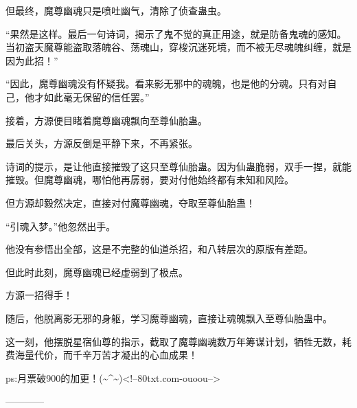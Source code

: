 \begin{this_body}
但最终，魔尊幽魂只是喷吐幽气，清除了侦查蛊虫。

“果然是这样。最后一句诗词，揭示了鬼不觉的真正用途，就是防备鬼魂的感知。当初盗天魔尊能盗取落魄谷、荡魂山，穿梭沉迷死境，而不被无尽魂魄纠缠，就是因为此招！”

“因此，魔尊幽魂没有怀疑我。看来影无邪中的魂魄，也是他的分魂。只有对自己，他才如此毫无保留的信任罢。”

接着，方源便目睹着魔尊幽魂飘向至尊仙胎蛊。

最后关头，方源反倒是平静下来，不再紧张。

诗词的提示，是让他直接摧毁了这只至尊仙胎蛊。因为仙蛊脆弱，双手一捏，就能摧毁。但魔尊幽魂，哪怕他再孱弱，要对付他始终都有未知和风险。

但方源却毅然决定，直接对付魔尊幽魂，夺取至尊仙胎蛊！

“引魂入梦。”他忽然出手。

他没有参悟出全部，这是不完整的仙道杀招，和八转层次的原版有差距。

但此时此刻，魔尊幽魂已经虚弱到了极点。

方源一招得手！

随后，他脱离影无邪的身躯，学习魔尊幽魂，直接让魂魄飘入至尊仙胎蛊中。

这一刻，他摆脱星宿仙尊的指示，截取了魔尊幽魂数万年筹谋计划，牺牲无数，耗费海量代价，而千辛万苦才凝出的心血成果！

ps:月票破900的加更！(\~{}\^{}\~{})<!--80txt.com-ouoou-->

------------

\end{this_body}

